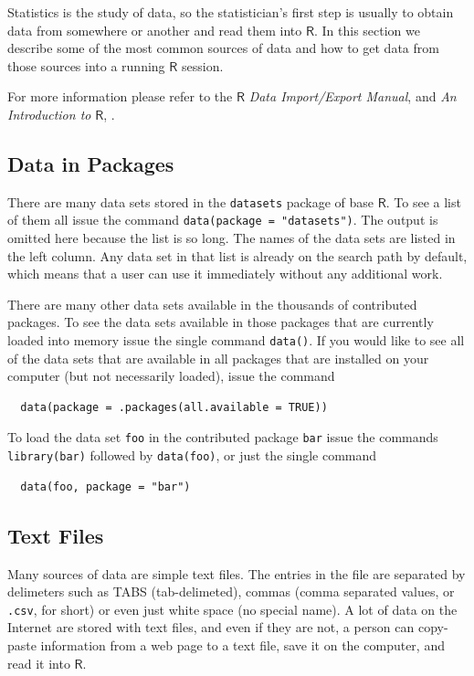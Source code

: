 \documentclass[captions=tableheading]{scrbook}
\begin{document}
\begin{example}
Statistics is the study of data, so the statistician's first step is usually to obtain data from somewhere or another and read them into \(\mathsf{R}\). In this section we describe some of the most common sources of data and how to get data from those sources into a running \(\mathsf{R}\) session.

For more information please refer to the \(\mathsf{R}\) \emph{Data Import/Export Manual}, \cite{rstatenv} and \emph{An Introduction to} \(\mathsf{R}\), \cite{Venables2010}.
\subsection{Data in Packages}
\label{sec-20-2-1}


There are many data sets stored in the \texttt{datasets} package of base \(\mathsf{R}\). To see a list of them all issue the command \texttt{data(package = "datasets")}. The output is omitted here because the list is so long. The names of the data sets are listed in the left column. Any data set in that list is already on the search path by default, which means that a user can use it immediately without any additional work. 

There are many other data sets available in the thousands of contributed packages. To see the data sets available in those packages that are currently loaded into memory issue the single command \texttt{data()}. If you would like to see all of the data sets that are available in all packages that are installed on your computer (but not necessarily loaded), issue the command 

\begin{verbatim}
  data(package = .packages(all.available = TRUE))
\end{verbatim}

To load the data set \texttt{foo} in the contributed package \texttt{bar} issue the commands \texttt{library(bar)} followed by \texttt{data(foo)}, or just the single command  

\begin{verbatim}
  data(foo, package = "bar")
\end{verbatim}
\subsection{Text Files}
\label{sec-20-2-2}

Many sources of data are simple text files. The entries in the file are separated by delimeters such as TABS (tab-delimeted), commas (comma separated values, or \texttt{.csv}, for short) or even just white space (no special name). A lot of data on the Internet are stored with text files, and even if they are not, a person can copy-paste information from a web page to a text file, save it on the computer, and read it into \(\mathsf{R}\). 

\end{example}
\end{document}
